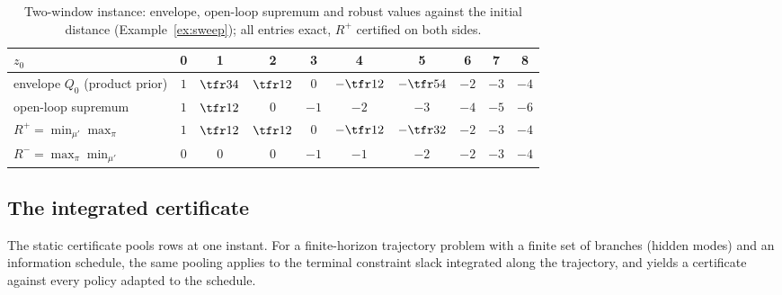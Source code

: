 \begin{table}[t]
\centering\small
\caption{Two-window instance: envelope, open-loop supremum and robust values against the initial distance (Example~\ref{ex:sweep}); all entries exact, $R^+$ certified on both sides.}
\label{tab:sweep}
\begin{tabular}{lccccccccc}
\toprule
$z_0$ & 0 & 1 & 2 & 3 & 4 & 5 & 6 & 7 & 8\\
\midrule
envelope $Q_0$ (product prior) & $1$ & $\tfr34$ & $\tfr12$ & $0$ & $-\tfr12$ & $-\tfr54$ & $-2$ & $-3$ & $-4$\\
open-loop supremum & $1$ & $\tfr12$ & $0$ & $-1$ & $-2$ & $-3$ & $-4$ & $-5$ & $-6$\\
$R^+=\min_{\mu'}\max_\pi$ & $1$ & $\tfr12$ & $\tfr12$ & $0$ & $-\tfr12$ & $-\tfr32$ & $-2$ & $-3$ & $-4$\\
$R^-=\max_\pi\min_{\mu'}$ & $0$ & $0$ & $0$ & $-1$ & $-1$ & $-2$ & $-2$ & $-3$ & $-4$\\
\bottomrule
\end{tabular}
\end{table}

\subsection{The integrated certificate}\label{sec:integrated}

The static certificate pools rows at one instant. For a finite-horizon trajectory problem with a finite set of branches (hidden modes) and an information schedule, the same pooling applies to the terminal constraint slack integrated along the trajectory, and yields a certificate against every policy adapted to the schedule.

